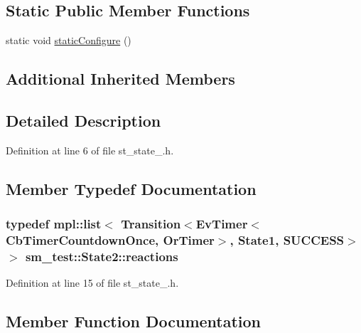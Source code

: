 \subsection*{Static Public Member Functions}
\begin{DoxyCompactItemize}
\item 
static void \hyperlink{structsm__test_1_1State2_ae346e36b141b813f7975293ce9dceb03}{static\+Configure} ()
\end{DoxyCompactItemize}
\subsection*{Additional Inherited Members}


\subsection{Detailed Description}


Definition at line 6 of file st\+\_\+state\+\_.\+h.



\subsection{Member Typedef Documentation}
\subsubsection[{\texorpdfstring{reactions}{reactions}}]{\setlength{\rightskip}{0pt plus 5cm}typedef mpl\+::list$<$ Transition$<${\bf Ev\+Timer}$<${\bf Cb\+Timer\+Countdown\+Once}, {\bf Or\+Timer}$>$, {\bf State1}, {\bf S\+U\+C\+C\+E\+SS}$>$ $>$ {\bf sm\+\_\+test\+::\+State2\+::reactions}}\hypertarget{structsm__test_1_1State2_a6a85570d55b07b8c3293a5eda604919c}{}\label{structsm__test_1_1State2_a6a85570d55b07b8c3293a5eda604919c}


Definition at line 15 of file st\+\_\+state\+\_.\+h.



\subsection{Member Function Documentation}
